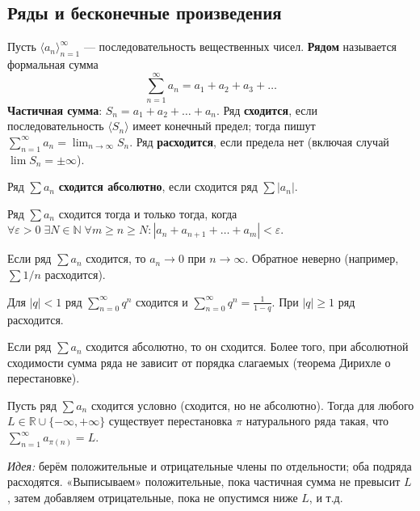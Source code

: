\documentclass[11pt, a4paper]{extarticle}
\newcommand{\ep}{\varepsilon}
\newcommand{\R}{{\mathbb R}}
\newcommand{\N}{{\mathbb N}}
\renewcommand{\ge}{\geqslant}
\begin{document}
\subsection{Ряды и бесконечные произведения}

\begin{definition}
Пусть $\langle a_n \rangle_{n=1}^\infty$ --- последовательность вещественных чисел. \textbf{Рядом} называется формальная сумма
$$\sum_{n=1}^\infty a_n = a_1 + a_2 + a_3 + \ldots$$
\textbf{Частичная сумма}: $S_n = a_1 + a_2 + \ldots + a_n$. Ряд \textbf{сходится}, если последовательность $\langle S_n \rangle$ имеет конечный предел; тогда пишут $\sum_{n=1}^\infty a_n = \lim_{n\to\infty} S_n$. Ряд \textbf{расходится}, если предела нет (включая случай $\lim S_n = \pm\infty$).
\end{definition}

\begin{definition}
Ряд $\sum a_n$ \textbf{сходится абсолютно}, если сходится ряд $\sum |a_n|$.
\end{definition}

\begin{theorem}
Ряд $\sum a_n$ сходится тогда и только тогда, когда $\forall \ep > 0\; \exists N \in \N\; \forall m \ge n \ge N: |a_n + a_{n+1} + \ldots + a_m| < \ep$.
\end{theorem}

\begin{theorem}
Если ряд $\sum a_n$ сходится, то $a_n \to 0$ при $n \to \infty$. Обратное неверно (например, $\sum 1/n$ расходится).
\end{theorem}

\begin{theorem}
Для $|q| < 1$ ряд $\sum_{n=0}^\infty q^n$ сходится и $\sum_{n=0}^\infty q^n = \frac{1}{1-q}$. При $|q| \ge 1$ ряд расходится.
\end{theorem}

\begin{theorem}
Если ряд $\sum a_n$ сходится абсолютно, то он сходится. Более того, при абсолютной сходимости сумма ряда не зависит от порядка слагаемых (теорема Дирихле о перестановке).
\end{theorem}

\begin{theorem}
Пусть ряд $\sum a_n$ сходится условно (сходится, но не абсолютно). Тогда для любого $L \in \R \cup \{-\infty, +\infty\}$ существует перестановка $\pi$ натурального ряда такая, что $\sum_{n=1}^\infty a_{\pi(n)} = L$.

\textit{Идея:} берём положительные и отрицательные члены по отдельности; оба подряда расходятся. «Выписываем» положительные, пока частичная сумма не превысит $L$, затем добавляем отрицательные, пока не опустимся ниже $L$, и т.д.
\end{theorem}
\end{document}
